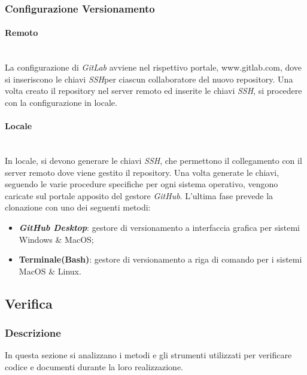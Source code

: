 \subsubsection{Configurazione Versionamento}

\paragraph{Remoto} \-\\
	La configurazione di \textit{GitLab} avviene nel rispettivo portale, www.gitlab.com, dove si inseriscono le chiavi \textit{SSH}\glossario per ciascun collaboratore del nuovo repository. 
	Una volta creato il repository nel server remoto ed inserite le chiavi \textit{SSH}, si procedere con la configurazione in locale.
	
\paragraph{Locale} \-\\
	In locale, si devono generare le chiavi \textit{SSH}, che permettono il collegamento con il server remoto dove viene gestito il repository. 
	Una volta generate le chiavi, seguendo le varie procedure specifiche per ogni sistema operativo, vengono caricate sul portale apposito del gestore \textit{GitHub}.
	L'ultima fase prevede la clonazione con uno dei seguenti metodi: 

	\begin{itemize}
		\item \textbf{\textit{GitHub Desktop}}: gestore di versionamento a interfaccia grafica per sistemi Windows \& MacOS; 
		\item \textbf{Terminale(Bash)}: gestore di versionamento a riga di comando per i sistemi MacOS \& Linux.
	\end{itemize}
		
\subsection{Verifica}\label{verifica}
\subsubsection{Descrizione}
In questa sezione si analizzano i metodi e gli strumenti utilizzati per verificare codice e documenti durante la loro realizzazione.

